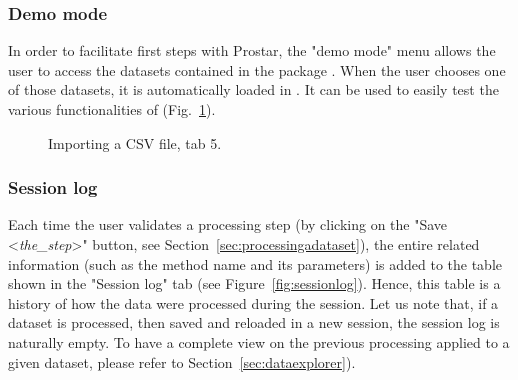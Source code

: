 \documentclass[12pt]{article}
\begin{document}
\subsubsection{Demo mode} \label{sec:demomode}

In order to facilitate first steps with Prostar, the "demo mode" menu allows 
the user to access the datasets contained in the package . 
When the user chooses one of those datasets, it is automatically loaded in 
. It can be used to easily test the various functionalities of
 (Fig.~\ref{fig:demomodeFig}).



\begin {figure}
\centering
{}
\caption{Importing a CSV file, tab 5.}\label{fig:demomodeFig}
\end {figure}


\subsubsection{Session log}\label{sec:sessionlog}

Each time the user validates a processing step (by clicking on the 
"Save <\emph{the\_step}>" button, see Section~\ref{sec:processingadataset}), 
the entire related information  (such as the method name and its parameters) 
is added to the table shown in the "Session log" tab 
(see Figure~\ref{fig:sessionlog}). Hence, this table is a history of how the 
data were processed during the session. 
Let us note that, if a dataset is processed, then saved and reloaded in a 
new session, the session log is naturally empty. To have a complete view on 
the previous processing applied to a given dataset, please refer to 
Section~\ref{sec:dataexplorer}).
\end{document}
